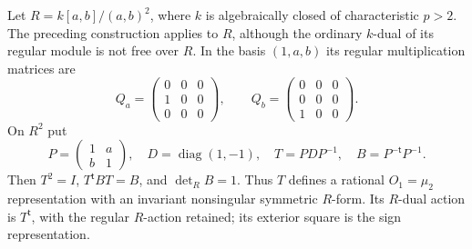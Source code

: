 \begin{proposition}
\label{C:artinian_algclosed_example}
Let $R=k[a,b]/(a,b)^2$, where $k$ is algebraically closed of
characteristic $p>2$. The preceding construction applies
to $R$, although the ordinary $k$-dual of its regular module is not
free over $R$. In the basis $(1,a,b)$ its regular multiplication matrices
are
\[
 Q_a=\begin{pmatrix}0&0&0\\1&0&0\\0&0&0\end{pmatrix},\qquad
 Q_b=\begin{pmatrix}0&0&0\\0&0&0\\1&0&0\end{pmatrix}.
                                                               \tag{C.3.A4}
\]
On $R^2$ put
\[
 P=\begin{pmatrix}1&a\\b&1\end{pmatrix},\quad
 D=\operatorname{diag}(1,-1),\quad
 T=PDP^{-1},\quad B=P^{-\mathsf t}P^{-1}.
                                                               \tag{C.3.A5}
\]
Then $T^2=I$, $T^{\mathsf t}BT=B$, and $\det_R B=1$.
Thus $T$ defines a rational $O_1=\mu_2$ representation with an
invariant nonsingular symmetric $R$-form. Its $R$-dual action is
$T^{\mathsf t}$, with the regular $R$-action retained; its exterior
square is the sign representation.
\end{proposition}
